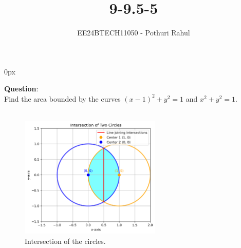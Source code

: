 \documentclass[journal]{IEEEtran}
\begin{document}

\vspace{3cm}
\parindent 0px

\title{9-9.5-5}
\author{EE24BTECH11050 - Pothuri Rahul}
{\let\newpage\relax\maketitle}

\renewcommand{\thefigure}{\theenumi}
\renewcommand{\thetable}{\theenumi}
\setlength{\intextsep}{10pt} %


\renewcommand{\thetable}{\theenumi}
\textbf{Question}:\\
Find the area bounded by the curves $(x-1)^2 + y^2 = 1$ and $x^2 + y^2 = 1$.  \\
\solution \\
\begin{figure}[h]
    \centering
    \includegraphics[width=0.6\textwidth]{fig.png}
    \caption{Intersection of the circles.}
\end{figure}
\end{document}
